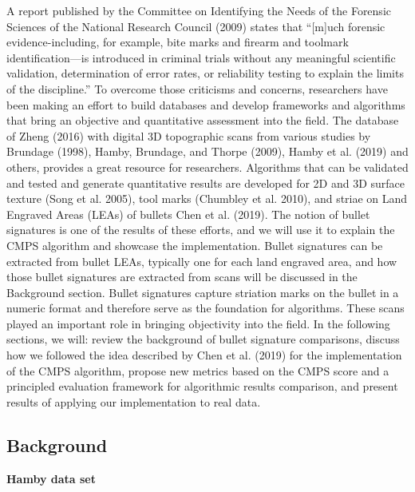 A report published by the Committee on Identifying the Needs of the Forensic Sciences of the National Research Council (2009) states that ``{[}m{]}uch forensic evidence-including, for example, bite marks and firearm and toolmark identification---is introduced in criminal trials without any meaningful scientific validation, determination of error rates, or reliability testing to explain the limits of the discipline.'' To overcome those criticisms and concerns, researchers have been making an effort to build databases and develop frameworks and algorithms that bring an objective and quantitative assessment into the field.
The database of Zheng (2016) with digital 3D topographic scans from various studies by Brundage (1998), Hamby, Brundage, and Thorpe (2009), Hamby et al. (2019) and others, provides a great resource for researchers. Algorithms that can be validated and tested and generate quantitative results are developed for 2D and 3D surface texture (Song et al. 2005), tool marks (Chumbley et al. 2010), and striae on Land Engraved Areas (LEAs) of bullets Chen et al. (2019).
The notion of bullet signatures is one of the results of these efforts, and we will use it to explain the CMPS algorithm and showcase the  implementation.
Bullet signatures can be extracted from bullet LEAs, typically one for each land engraved area, and how those bullet signatures are extracted from scans will be discussed in the Background section.
Bullet signatures capture striation marks on the bullet in a numeric format and therefore serve as the foundation for algorithms. These scans played an important role in bringing objectivity into the field.
In the following sections, we will: review the background of bullet signature comparisons, discuss how we followed the idea described by Chen et al. (2019) for the implementation of the CMPS algorithm, propose new metrics based on the CMPS score and a principled evaluation framework for algorithmic results comparison, and present results of applying our implementation to real data.

\hypertarget{background}{%
\subsection{Background}\label{background}}

\textbf{Hamby data set}


